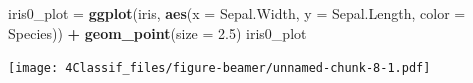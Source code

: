 \documentclass[10pt,ignorenonframetext,]{beamer}
\newenvironment{Shaded}{\begin{snugshade}}{\end{snugshade}}
\newcommand{\KeywordTok}[1]{\textcolor[rgb]{0.13,0.29,0.53}{\textbf{#1}}}
\newcommand{\DataTypeTok}[1]{\textcolor[rgb]{0.13,0.29,0.53}{#1}}
\newcommand{\FloatTok}[1]{\textcolor[rgb]{0.00,0.00,0.81}{#1}}
\newcommand{\StringTok}[1]{\textcolor[rgb]{0.31,0.60,0.02}{#1}}
\newcommand{\OperatorTok}[1]{\textcolor[rgb]{0.81,0.36,0.00}{\textbf{#1}}}
\newcommand{\NormalTok}[1]{#1}
\begin{document}
\begin{frame}[fragile]

\begin{Shaded}
\begin{Highlighting}[]
\NormalTok{iris0_plot =}\StringTok{ }\KeywordTok{ggplot}\NormalTok{(iris, }\KeywordTok{aes}\NormalTok{(}\DataTypeTok{x =}\NormalTok{ Sepal.Width, }\DataTypeTok{y =}\NormalTok{ Sepal.Length, }\DataTypeTok{color =}\NormalTok{ Species)) }\OperatorTok{+}\StringTok{ }
\StringTok{    }\KeywordTok{geom_point}\NormalTok{(}\DataTypeTok{size =} \FloatTok{2.5}\NormalTok{)}
\NormalTok{iris0_plot}
\end{Highlighting}
\end{Shaded}

\texttt{[image: 4Classif\_files/figure-beamer/unnamed-chunk-8-1.pdf]}

\end{frame}
\end{document}
